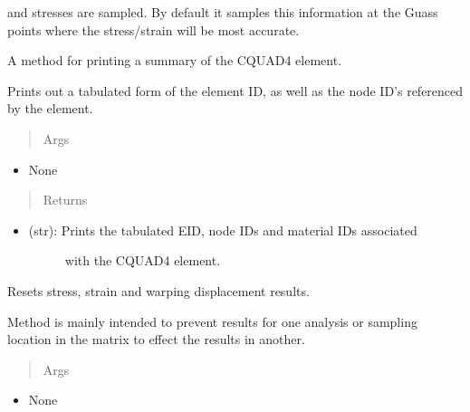 \documentclass[letterpaper,10pt,english]{sphinxmanual}
\begin{document}
\begin{fulllineitems}
\begin{fulllineitems}
and stresses are sampled. By default it samples this information at the
Guass points where the stress/strain will be most accurate.

\end{fulllineitems}


\begin{fulllineitems}
\label{structures:AeroComBAT.Structures.CQUAD4.printSummary}
A method for printing a summary of the CQUAD4 element.

Prints out a tabulated form of the element ID, as well as the node ID's
referenced by the element.
\begin{quote}\begin{description}
\item[{Args}] \leavevmode
\end{description}\end{quote}
\begin{itemize}
\item {} 
None

\end{itemize}
\begin{quote}\begin{description}
\item[{Returns}] \leavevmode
\end{description}\end{quote}
\begin{itemize}
\item {} \begin{description}
\item[{(str): Prints the tabulated EID, node IDs and material IDs associated}] \leavevmode
with the CQUAD4 element.

\end{description}

\end{itemize}

\end{fulllineitems}


\begin{fulllineitems}
\label{structures:AeroComBAT.Structures.CQUAD4.resetResults}
Resets stress, strain and warping displacement results.

Method is mainly intended to prevent results for one analysis or
sampling location in the matrix to effect the results in another.
\begin{quote}\begin{description}
\item[{Args}] \leavevmode
\end{description}\end{quote}
\begin{itemize}
\item {} 
None


\end{itemize}
\end{fulllineitems}
\end{fulllineitems}
\end{document}
